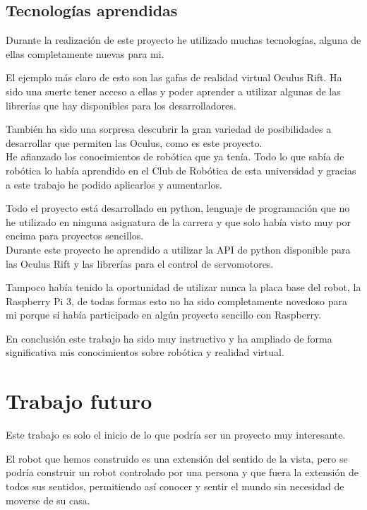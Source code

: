 \documentclass[twoside, 11pt]{epstfg}
\begin{document}
\subsection{Tecnologías aprendidas}

Durante la realización de este proyecto he utilizado muchas tecnologías, alguna de ellas completamente nuevas para mi.

El ejemplo más claro de esto son las gafas de realidad virtual Oculus Rift. Ha sido una suerte tener acceso a ellas y poder aprender a utilizar algunas de las librerías que hay disponibles para los desarrolladores.

También ha sido una sorpresa descubrir la gran variedad de posibilidades a desarrollar que permiten las Oculus, como es este proyecto.\\
He afianzado los conocimientos de robótica que ya tenía. Todo lo que sabía de robótica lo había aprendido en el Club de Robótica de esta universidad y gracias a este trabajo he podido aplicarlos y aumentarlos.

Todo el proyecto está desarrollado en python, lenguaje de programación que no he utilizado en ninguna asignatura de la carrera y que solo había visto muy por encima para proyectos sencillos.\\
Durante este proyecto he aprendido a utilizar la API de python disponible para las Oculus Rift y las librerías para el control de servomotores.

Tampoco había tenido la oportunidad de utilizar nunca la placa base del robot, la Raspberry Pi 3, de todas formas esto no ha sido completamente novedoso para mi porque sí había participado en algún proyecto sencillo con Raspberry.

En conclusión este trabajo ha sido muy instructivo y ha ampliado de forma significativa mis conocimientos sobre robótica y realidad virtual.



\section{Trabajo futuro}
Este trabajo es solo el inicio de lo que podría ser un proyecto muy interesante.

El robot que hemos construido es una extensión del sentido de la vista, pero se podría construir un robot controlado por una persona y que fuera la extensión de todos sus sentidos, permitiendo así conocer y sentir el mundo sin necesidad de moverse de su casa.
\end{document}
